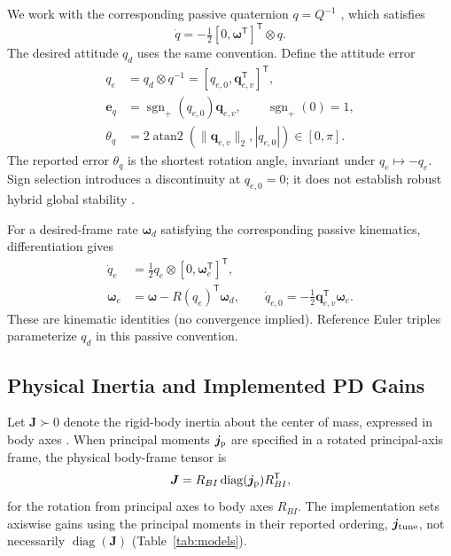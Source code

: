 \documentclass[letterpaper, 10 pt, conference]{ieeeconf}
\newcommand{\T}{^{\mathsf T}}
\newcommand{\sgnp}{\operatorname{sgn}_{+}}
\begin{document}
We work with the corresponding passive quaternion $q=Q^{-1}$ \cite{diebel2006quaternion}, which satisfies
\begin{equation}
 \dot q=-\tfrac12[0,\bm\omega\T]\T\otimes q.
 \label{eq:passive}
\end{equation}
The desired attitude $q_d$ uses the same convention. Define the attitude error
\begin{align}
 q_e&=q_d\otimes q^{-1}=[q_{e,0},\bm q_{e,v}\T]\T,\\
 \bm e_q&=\sgnp(q_{e,0})\bm q_{e,v},\qquad \sgnp(0)=1,\\
 \theta_q&=2\operatorname{atan2}(\|\bm q_{e,v}\|_2,|q_{e,0}|)
             \in[0,\pi].
 \label{eq:theta}
\end{align}
The reported error $\theta_q$ is the shortest rotation angle, invariant under $q_e\mapsto-q_e$. Sign selection introduces a discontinuity at $q_{e,0}=0$; it does not establish robust hybrid global stability \cite{mayhew2011hybrid}.

For a desired-frame rate $\bm\omega_d$ satisfying the corresponding passive kinematics, differentiation gives
\begin{align}
 \dot q_e&=\tfrac12q_e\otimes[0,\bm\omega_e\T]\T,\\
 \bm\omega_e&=\bm\omega-R(q_e)\T\bm\omega_d,\qquad
 \dot q_{e,0}=-\tfrac12\bm q_{e,v}\T\bm\omega_e.
 \label{eq:errkin}
\end{align}
These are kinematic identities (no convergence implied). Reference Euler triples parameterize $q_d$ in this passive convention.

\subsection{Physical Inertia and Implemented PD Gains}
Let $\bm J\succ0$ denote the rigid-body inertia about the center of mass, expressed in body axes \cite{schaub2018amss}. When principal moments $\bm j_{\rm p}$ are specified in a rotated principal-axis frame, the physical body-frame tensor is
\begin{equation}
 \bm J=R_{BI}\operatorname{diag}(\bm j_{\rm p})R_{BI}\T,
 \label{eq:inertiaframe}
\end{equation}
for the rotation from principal axes to body axes $R_{BI}$. The implementation sets axiswise gains using the principal moments in their reported ordering, $\bm j_{\rm tune}$, not necessarily $\operatorname{diag}(\bm J)$ (Table~\ref{tab:models}).
\end{document}
